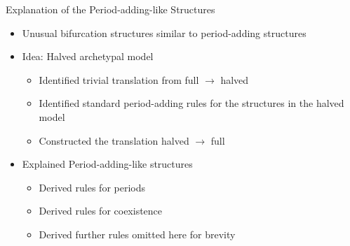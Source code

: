 \begin{frame}{Explanation of the Period-adding-like Structures}
	\begin{itemize}
		\item Unusual bifurcation structures similar to period-adding structures
		      \pause
		\item Idea: Halved archetypal model
		      \begin{itemize}
			      \item Identified trivial translation from full $\to$ halved
			      \item Identified standard period-adding rules for the structures in the halved model
			      \item Constructed the translation halved $\to$ full
		      \end{itemize}
		      \pause
		\item Explained Period-adding-like structures
		      \begin{itemize}
			      \item Derived rules for periods
			      \item Derived rules for coexistence
			      \item Derived further rules omitted here for brevity
		      \end{itemize}
	\end{itemize}
\end{frame}
